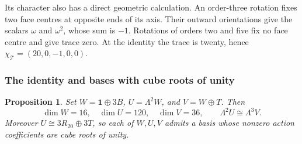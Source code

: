 \documentclass[11pt,a4paper]{article}
\newtheorem{proposition}{Proposition}[section]
\begin{document}
Its character also has a direct geometric calculation. An order-three
rotation fixes two face centres at opposite ends of its axis. Their
outward orientations give the scalars $\omega$ and $\omega^2$, whose
sum is $-1$. Rotations of orders two and five fix no face centre and
give trace zero. At the identity the trace is twenty, hence
$\chi_{\mathcal T}=(20,0,-1,0,0)$.

\subsubsection*{The identity and bases with cube roots of unity}

\begin{proposition}\label{prop:lines-identity}
Set $W=\mathbf1\oplus3B$, $U=\Lambda^2W$, and $V=W\oplus T$.
Then
\[
\dim W=16,\quad\dim U=120,\quad\dim V=36,\qquad
\Lambda^2U\cong\Lambda^3V.
\]
Moreover $U\cong3R_{20}\oplus3T$, so each of $W,U,V$ admits a basis
whose nonzero action coefficients are cube roots of unity.
\end{proposition}
\end{document}

